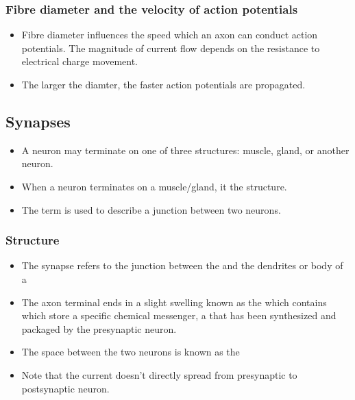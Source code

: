 \documentclass{article}
\numberwithin{equation}{section}
\begin{document}
\subsubsection{Fibre diameter and the velocity of action potentials}
\begin{itemize}
    \item Fibre diameter influences the speed which an axon can conduct action potentials. The magnitude of current flow depends on the resistance to electrical charge movement.
    \item The larger the diamter, the faster action potentials are propagated.
\end{itemize}
\subsection{Synapses}
\begin{itemize}
    \item A neuron may terminate on one of three structures: muscle, gland, or another neuron.
    \item When a neuron terminates on a muscle/gland, it  the structure.
    \item The term  is used to describe a junction between two neurons.
\end{itemize}
\subsubsection{Structure}
\begin{itemize}
    \item The synapse refers to the junction between the  and the dendrites or body of a 
    \item The axon terminal ends in a slight swelling known as the  which contains  which store a specific chemical messenger, a  that has been synthesized and packaged by the presynaptic neuron.
    \item The space between the two neurons is known as the 
    \item Note that the current doesn't directly spread from presynaptic to postsynaptic neuron.
\end{itemize}
\end{document}
